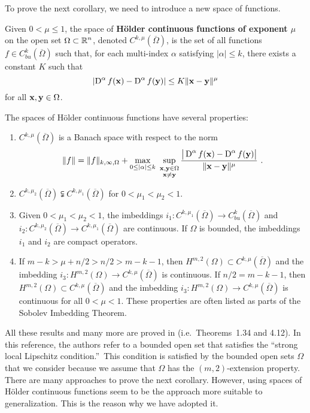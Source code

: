 To prove the next corollary, we need to introduce a new space of
functions.

\begin{defn} \label{defnHolderContFunct}
Given $0 < \mu \leq 1$, the space of {\bfseries Hölder continuous
functions of exponent $\mu$} on the open set $\displaystyle \Omega \subset \mathbb{R}^n$,
denoted $\displaystyle C^{k,\mu}(\overline{\Omega})$, is
the set of all functions $\displaystyle f \in C_{bu}^k(\overline{\Omega})$
such that, for each multi-index $\alpha$ satisfying $|\alpha|\leq k$,
there exists a constant $K$ such that
\[
  \left| \operatorname{D}^\alpha f(\mathbf{x}) - \operatorname{D}^\alpha f(\mathbf{y}) \right|
  \leq K \|\mathbf{x} - \mathbf{y} \|^{\mu}
\]
for all $\mathbf{x}, \mathbf{y} \in \Omega$.
\end{defn}

The spaces of Hölder continuous functions have several properties:
\begin{enumerate}
\item $\displaystyle C^{k,\mu}(\overline{\Omega})$ is a Banach space
with respect to the norm
\[
\|f\| = \|f\|_{k,\infty,\Omega} + \max_{0\leq |\alpha|\leq k}
\ \sup_{\substack{\mathbf{x},\mathbf{y} \in \Omega\\ \mathbf{x} \neq \mathbf{y}}}
\frac{\big|\operatorname{D}^\alpha f(\mathbf{x}) - \operatorname{D}^\alpha f(\mathbf{y})\big|}
{\|\mathbf{x}-\mathbf{y}\|^{\mu}} \ .
\]
\item $\displaystyle C^{k,\mu_2}(\overline{\Omega})
\subsetneqq C^{k,\mu_1}(\overline{\Omega})$ for $0 < \mu_1 < \mu_2 < 1$.
\item Given $0 < \mu_1 < \mu_2 < 1$, the imbeddings
$\displaystyle i_1 : C^{k,\mu_1}(\overline{\Omega})
\to C_{bu}^k(\overline{\Omega})$
and
$\displaystyle i_2 : C^{k,\mu_2}(\overline{\Omega})
\to C^{k,\mu_1}(\overline{\Omega})$
are continuous.  If $\Omega$ is bounded, the imbeddings $i_1$ and
$i_2$ are compact operators.
\item If $m-k > \mu + n/2 > n/2 > m-k-1$, then
$\displaystyle H^{m,2}(\Omega) \subset C^{k,\mu}(\overline{\Omega})$
and the imbedding
$\displaystyle i_3: H^{m,2}(\Omega) \to C^{k,\mu}(\overline{\Omega})$
is continuous.  If $n/2 = m-k-1$, then
$\displaystyle H^{m,2}(\Omega) \subset C^{k,\mu}(\overline{\Omega})$
and the imbedding
$\displaystyle i_3: H^{m,2}(\Omega) \to C^{k,\mu}(\overline{\Omega})$
is continuous for all $0<\mu<1$.  These properties are often listed
as parts of the Sobolev Imbedding Theorem.
\end{enumerate}
All these results and many more are proved in \cite{Ad} (i.e.\ Theorems~1.34
and 4.12).  In this reference, the authors refer to a bounded open set
that satisfies the ``strong local Lipschitz condition.''\ This
condition is satisfied
by the bounded open sets $\Omega$ that we consider because we assume
that $\Omega$ has the $(m,2)$-extension property.
There are many approaches to prove the next corollary.  However, using spaces of
Hölder continuous functions seem to be the approach more suitable to
generalization.  This is the reason why we have adopted it.

